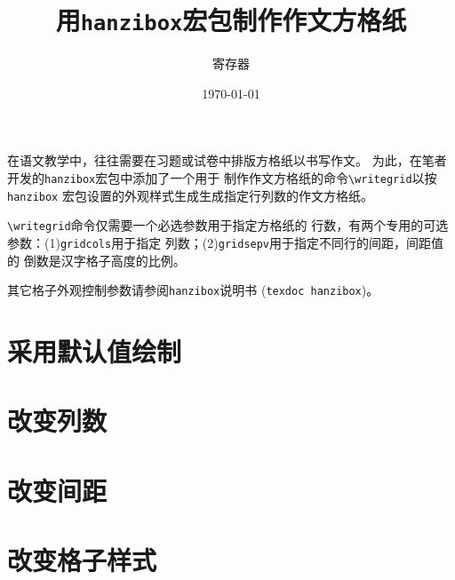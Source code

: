 \documentclass{ctexart}
\title{\Large 用\texttt{hanzibox}宏包制作作文方格纸}
\author{寄存器}
\date{\today}
\begin{document}
\maketitle

在语文教学中，往往需要在习题或试卷中排版方格纸以书写作文。
为此，在笔者开发的\texttt{hanzibox}宏包中添加了一个用于
制作作文方格纸的命令\verb|\writegrid|以按\texttt{hanzibox}%
宏包设置的外观样式生成生成指定行列数的作文方格纸。

\verb|\writegrid|命令仅需要一个必选参数用于指定方格纸的
行数，有两个专用的可选参数：(1)\texttt{gridcols}用于指定
列数；(2)\texttt{gridsepv}用于指定不同行的间距，间距值的
倒数是汉字格子高度的比例。

其它格子外观控制参数请参阅\texttt{hanzibox}说明书
(\texttt{texdoc hanzibox})。

\section{采用默认值绘制}
\begin{center}
\end{center}

\section{改变列数}
\begin{minipage}{0.45\textwidth}
  \centering
\end{minipage}\qquad
\begin{minipage}{0.45\textwidth}
  \centering
\end{minipage}

\section{改变间距}
\begin{minipage}{0.45\textwidth}
  \centering
\end{minipage}\qquad
\begin{minipage}{0.45\textwidth}
  \centering
\end{minipage}

\section{改变格子样式}
\centering
{}

\bigskip

\centering
{}
\end{document}
